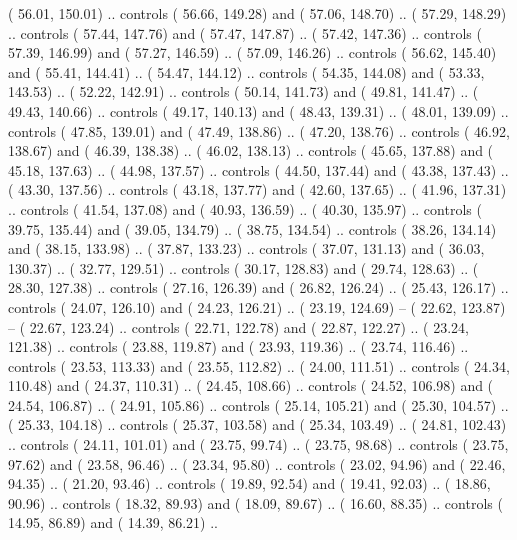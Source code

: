 {        (  56.01, 150.01) .. controls (  56.66, 149.28) and (  57.06, 148.70) ..
        (  57.29, 148.29) .. controls (  57.44, 147.76) and (  57.47, 147.87) ..
        (  57.42, 147.36) .. controls (  57.39, 146.99) and (  57.27, 146.59) ..
        (  57.09, 146.26) .. controls (  56.62, 145.40) and (  55.41, 144.41) ..
        (  54.47, 144.12) .. controls (  54.35, 144.08) and (  53.33, 143.53) ..
        (  52.22, 142.91) .. controls (  50.14, 141.73) and (  49.81, 141.47) ..
        (  49.43, 140.66) .. controls (  49.17, 140.13) and (  48.43, 139.31) ..
        (  48.01, 139.09) .. controls (  47.85, 139.01) and (  47.49, 138.86) ..
        (  47.20, 138.76) .. controls (  46.92, 138.67) and (  46.39, 138.38) ..
        (  46.02, 138.13) .. controls (  45.65, 137.88) and (  45.18, 137.63) ..
        (  44.98, 137.57) .. controls (  44.50, 137.44) and (  43.38, 137.43) ..
        (  43.30, 137.56) .. controls (  43.18, 137.77) and (  42.60, 137.65) ..
        (  41.96, 137.31) .. controls (  41.54, 137.08) and (  40.93, 136.59) ..
        (  40.30, 135.97) .. controls (  39.75, 135.44) and (  39.05, 134.79) ..
        (  38.75, 134.54) .. controls (  38.26, 134.14) and (  38.15, 133.98) ..
        (  37.87, 133.23) .. controls (  37.07, 131.13) and (  36.03, 130.37) ..
        (  32.77, 129.51) .. controls (  30.17, 128.83) and (  29.74, 128.63) ..
        (  28.30, 127.38) .. controls (  27.16, 126.39) and (  26.82, 126.24) ..
        (  25.43, 126.17) .. controls (  24.07, 126.10) and (  24.23, 126.21) ..
        (  23.19, 124.69) -- 
        (  22.62, 123.87) -- 
        (  22.67, 123.24) .. controls (  22.71, 122.78) and (  22.87, 122.27) ..
        (  23.24, 121.38) .. controls (  23.88, 119.87) and (  23.93, 119.36) ..
        (  23.74, 116.46) .. controls (  23.53, 113.33) and (  23.55, 112.82) ..
        (  24.00, 111.51) .. controls (  24.34, 110.48) and (  24.37, 110.31) ..
        (  24.45, 108.66) .. controls (  24.52, 106.98) and (  24.54, 106.87) ..
        (  24.91, 105.86) .. controls (  25.14, 105.21) and (  25.30, 104.57) ..
        (  25.33, 104.18) .. controls (  25.37, 103.58) and (  25.34, 103.49) ..
        (  24.81, 102.43) .. controls (  24.11, 101.01) and (  23.75,  99.74) ..
        (  23.75,  98.68) .. controls (  23.75,  97.62) and (  23.58,  96.46) ..
        (  23.34,  95.80) .. controls (  23.02,  94.96) and (  22.46,  94.35) ..
        (  21.20,  93.46) .. controls (  19.89,  92.54) and (  19.41,  92.03) ..
        (  18.86,  90.96) .. controls (  18.32,  89.93) and (  18.09,  89.67) ..
        (  16.60,  88.35) .. controls (  14.95,  86.89) and (  14.39,  86.21) ..
}
